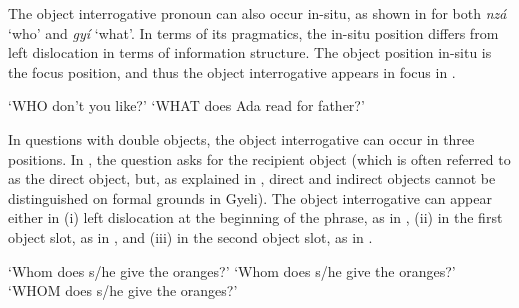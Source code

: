 The object interrogative pronoun can also occur in-situ, as shown in  for both {\itshape nzá} `who' and {\itshape gyí} `what'.  In terms of its pragmatics, the in-situ position differs from left dislocation in terms of information structure. The object position in-situ is the focus position, and thus the object interrogative appears in focus in .

\ea\label{OCQ3}
    \trans `WHO don't you like?'
    \trans `WHAT does Ada read for father?'
\z
\z 



In questions with double objects, the object interrogative can occur in three positions. In , the question asks for the recipient object (which is often referred to as the direct object, but, as explained in , direct and indirect objects cannot be distinguished on formal grounds in Gyeli). The object interrogative can appear either in (i) left dislocation at the beginning of the phrase, as in , (ii) in the first object slot, as in , and (iii) in the second object slot, as in .

\ea\label{QIO}
    \trans `Whom does s/he give the oranges?'
    \trans `Whom does s/he give the oranges?'
    \trans `WHOM does s/he give the oranges?'
\z
\z


